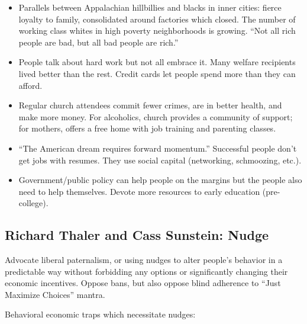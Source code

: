 \documentclass[
]{article}
\begin{document}
\begin{itemize}
\item
  Parallels between Appalachian hillbillies and blacks in inner cities:
  fierce loyalty to family, consolidated around factories which closed.
  The number of working class whites in high poverty neighborhoods is
  growing. ``Not all rich people are bad, but all bad people are rich.''
\item
  People talk about hard work but not all embrace it. Many welfare
  recipients lived better than the rest. Credit cards let people spend
  more than they can afford.
\item
  Regular church attendees commit fewer crimes, are in better health,
  and make more money. For alcoholics, church provides a community of
  support; for mothers, offers a free home with job training and
  parenting classes.
\item
  ``The American dream requires forward momentum.'' Successful people
  don't get jobs with resumes. They use social capital (networking,
  schmoozing, etc.).
\item
  Government/public policy can help people on the margins but the people
  also need to help themselves. Devote more resources to early education
  (pre-college).
\end{itemize}

\hypertarget{richard-thaler-and-cass-sunstein-nudge}{%
\subsection{Richard Thaler and Cass Sunstein:
Nudge}\label{richard-thaler-and-cass-sunstein-nudge}}

Advocate liberal paternalism, or using nudges to alter people's behavior
in a predictable way without forbidding any options or significantly
changing their economic incentives. Oppose bans, but also oppose blind
adherence to ``Just Maximize Choices'' mantra.

Behavioral economic traps which necessitate nudges:
\end{document}
